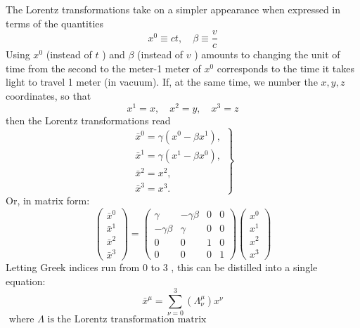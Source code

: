  The Lorentz transformations take on a simpler appearance when expressed in terms of the quantities
$$
x^{0} \equiv c t, \quad \beta \equiv \frac{v}{c}
$$
Using $x^{0}$ (instead of $t$ ) and $\beta$ (instead of $v$ ) amounts to changing the unit of time from the second to the meter-1 meter of $x^{0}$ corresponds to the time it takes light to travel 1 meter (in vacuum). If, at the same time, we number the $x, y, z$ coordinates, so that
$$x^{1}=x, \quad x^{2}=y, \quad x^{3}=z$$
 then the Lorentz transformations read
 $$\left.\begin{array}{l}
 	\bar{x}^{0}=\gamma\left(x^{0}-\beta x^{1}\right), \\
 	\bar{x}^{1}=\gamma\left(x^{1}-\beta x^{0}\right), \\
 	\bar{x}^{2}=x^{2}, \\
 	\bar{x}^{3}=x^{3} .
 \end{array}\right\}$$
 Or, in matrix form:
 $$\left(\begin{array}{c}
 	\bar{x}^{0} \\
 	\bar{x}^{1} \\
 	\bar{x}^{2} \\
 	\bar{x}^{3}
 \end{array}\right)=\left(\begin{array}{cccc}
 	\gamma & -\gamma \beta & 0 & 0 \\
 	-\gamma \beta & \gamma & 0 & 0 \\
 	0 & 0 & 1 & 0 \\
 	0 & 0 & 0 & 1
 \end{array}\right)\left(\begin{array}{c}
 	x^{0} \\
 	x^{1} \\
 	x^{2} \\
 	x^{3}
 \end{array}\right)$$
 Letting Greek indices run from 0 to 3 , this can be distilled into a single equation:
 $$
 \bar{x}^{\mu}=\sum_{\nu=0}^{3}\left(\Lambda_{\nu}^{\mu}\right) x^{\nu}
 $$
$\text { where } \Lambda \text { is the Lorentz transformation matrix }$\\
